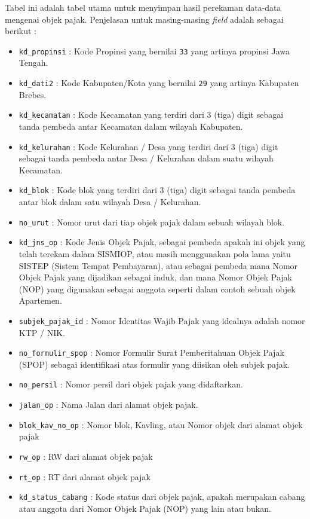 Tabel ini adalah tabel utama untuk menyimpan hasil perekaman data-data mengenai objek pajak. Penjelasan untuk masing-masing \textit{field} adalah sebagai berikut :

\begin{itemize}
	\item \texttt{kd\_propinsi} : Kode Propinsi yang bernilai \texttt{33} yang artinya propinsi Jawa Tengah.
	\item \texttt{kd\_dati2} : Kode Kabupaten/Kota yang bernilai \texttt{29} yang artinya Kabupaten Brebes.
	\item \texttt{kd\_kecamatan} : Kode Kecamatan yang terdiri dari 3 (tiga) digit sebagai tanda pembeda antar Kecamatan dalam wilayah Kabupaten.
	\item \texttt{kd\_kelurahan} : Kode Kelurahan / Desa yang terdiri dari 3 (tiga) digit sebagai tanda pembeda antar Desa / Kelurahan dalam suatu wilayah Kecamatan.
	\item \texttt{kd\_blok} : Kode blok yang terdiri dari 3 (tiga) digit sebagai tanda pembeda antar blok dalam satu wilayah Desa / Kelurahan.
	\item \texttt{no\_urut} : Nomor urut dari tiap objek pajak dalam sebuah wilayah blok.
	\item \texttt{kd\_jns\_op} : Kode Jenis Objek Pajak, sebagai pembeda apakah ini objek yang telah terekam dalam SISMIOP, atau masih menggunakan pola lama yaitu SISTEP (Sistem Tempat Pembayaran), atau sebagai pembeda mana Nomor Objek Pajak yang dijadikan sebagai induk, dan mana Nomor Objek Pajak (NOP) yang digunakan sebagai anggota seperti dalam contoh sebuah objek Apartemen.
	\item \texttt{subjek\_pajak\_id} : Nomor Identitas Wajib Pajak yang idealnya adalah nomor KTP / NIK.
	\item \texttt{no\_formulir\_spop} : Nomor Formulir Surat Pemberitahuan Objek Pajak (SPOP) sebagai identifikasi atas formulir yang diisikan oleh subjek pajak.
	\item \texttt{no\_persil} : Nomor persil dari objek pajak yang didaftarkan.
	\item \texttt{jalan\_op} : Nama Jalan dari alamat objek pajak.
	\item \texttt{blok\_kav\_no\_op} : Nomor blok, Kavling, atau Nomor objek dari alamat objek pajak
	\item \texttt{rw\_op} : RW dari alamat objek pajak
	\item \texttt{rt\_op} : RT dari alamat objek pajak
	\item \texttt{kd\_status\_cabang} : Kode status dari objek pajak, apakah merupakan cabang atau anggota dari Nomor Objek Pajak (NOP) yang lain atau bukan.

\end{itemize}
